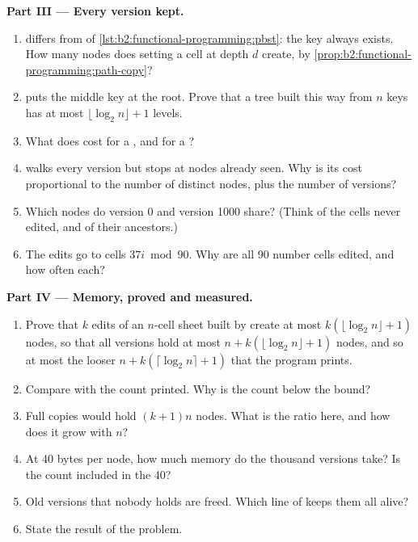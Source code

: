 \begin{problem}
\medskip\noindent\textbf{Part III --- Every version kept.}\par\nopagebreak
{}
\begin{enumerate}[resume, beginpenalty=10000]
\item {} differs from  of \cref{lst:b2:functional-programming:pbst}: the key always exists.
How many nodes does setting a cell at depth $d$ create, by \cref{prop:b2:functional-programming:path-copy}?
\item {} puts the middle key at the root. Prove that a tree built this way from $n$ keys has at most
$\lfloor \log_2 n \rfloor + 1$ levels.
\item What does  cost for a , and for a ?
\item {} walks every version but stops at nodes already seen. Why is its cost proportional to the
number of distinct nodes, plus the number of versions?
\item Which nodes do version 0 and version 1000 share? (Think of the cells never edited, and of their
ancestors.)
\item The edits go to cells $37i \bmod 90$. Why are all 90 number cells edited, and how often each?
\end{enumerate}

\medskip\noindent\textbf{Part IV --- Memory, proved and measured.}\par\nopagebreak
{}
\begin{enumerate}[resume, beginpenalty=10000]
\item Prove that $k$ edits of an $n$-cell sheet built by  create at most $k(\lfloor \log_2 n \rfloor + 1)$
nodes, so that all versions hold at most $n + k(\lfloor \log_2 n \rfloor + 1)$ nodes, and so at most the looser
$n + k(\lceil \log_2 n \rceil + 1)$ that the program prints.
\item Compare with the count printed. Why is the count below the bound?
\item Full copies would hold $(k + 1)n$ nodes. What is the ratio here, and how does it grow with $n$?
\item At 40 bytes per node, how much memory do the thousand versions take? Is the  count included in the 40?
\item Old versions that nobody holds are freed. Which line of  keeps them all alive?
\item State the result of the problem.
\end{enumerate}
\end{problem}

